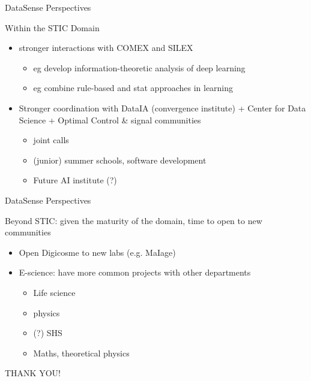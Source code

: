 \begin{frame}{DataSense Perspectives}

Within the STIC Domain

\begin{itemize}
\item stronger interactions with COMEX and SILEX
  \begin{itemize}
  \item eg develop information-theoretic analysis of deep learning
  \item eg combine rule-based and stat approaches in learning
  \end{itemize}
\item Stronger coordination with DataIA (convergence institute) + Center for Data Science + Optimal Control \& signal communities
  \begin{itemize}
  \item joint calls
  \item (junior) summer schools, software development
  \item Future AI institute (?)
  \end{itemize}
\end{itemize}


\end{frame}


\begin{frame}{DataSense Perspectives}

Beyond STIC: given the maturity of the domain, time to open to new communities

\begin{itemize}
\item Open Digicosme to new labs (e.g. MaIage)
\item E-science: have more common projects with  other departments
  \begin{itemize}
  \item Life science
  \item physics
  \item (?) SHS
  \item Maths, theoretical physics
  \end{itemize}
\end{itemize}

\end{frame}

\begin{frame}[plain]{}

  \vfill
  \begin{center}
    \huge THANK YOU!
  \end{center}
  \vfill

\end{frame}

